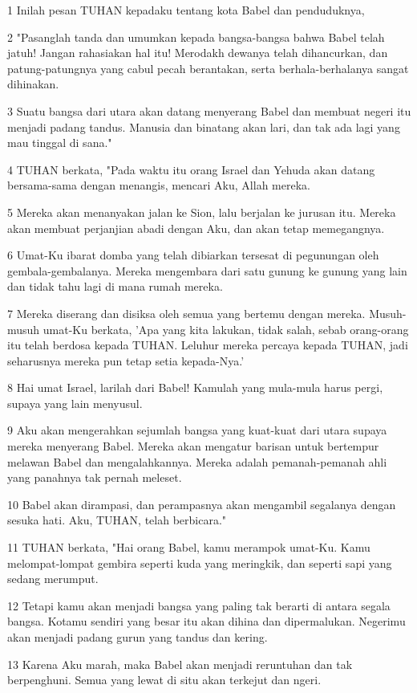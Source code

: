 \par 1 Inilah pesan TUHAN kepadaku tentang kota Babel dan penduduknya,
\par 2 "Pasanglah tanda dan umumkan kepada bangsa-bangsa bahwa Babel telah jatuh! Jangan rahasiakan hal itu! Merodakh dewanya telah dihancurkan, dan patung-patungnya yang cabul pecah berantakan, serta berhala-berhalanya sangat dihinakan.
\par 3 Suatu bangsa dari utara akan datang menyerang Babel dan membuat negeri itu menjadi padang tandus. Manusia dan binatang akan lari, dan tak ada lagi yang mau tinggal di sana."
\par 4 TUHAN berkata, "Pada waktu itu orang Israel dan Yehuda akan datang bersama-sama dengan menangis, mencari Aku, Allah mereka.
\par 5 Mereka akan menanyakan jalan ke Sion, lalu berjalan ke jurusan itu. Mereka akan membuat perjanjian abadi dengan Aku, dan akan tetap memegangnya.
\par 6 Umat-Ku ibarat domba yang telah dibiarkan tersesat di pegunungan oleh gembala-gembalanya. Mereka mengembara dari satu gunung ke gunung yang lain dan tidak tahu lagi di mana rumah mereka.
\par 7 Mereka diserang dan disiksa oleh semua yang bertemu dengan mereka. Musuh-musuh umat-Ku berkata, 'Apa yang kita lakukan, tidak salah, sebab orang-orang itu telah berdosa kepada TUHAN. Leluhur mereka percaya kepada TUHAN, jadi seharusnya mereka pun tetap setia kepada-Nya.'
\par 8 Hai umat Israel, larilah dari Babel! Kamulah yang mula-mula harus pergi, supaya yang lain menyusul.
\par 9 Aku akan mengerahkan sejumlah bangsa yang kuat-kuat dari utara supaya mereka menyerang Babel. Mereka akan mengatur barisan untuk bertempur melawan Babel dan mengalahkannya. Mereka adalah pemanah-pemanah ahli yang panahnya tak pernah meleset.
\par 10 Babel akan dirampasi, dan perampasnya akan mengambil segalanya dengan sesuka hati. Aku, TUHAN, telah berbicara."
\par 11 TUHAN berkata, "Hai orang Babel, kamu merampok umat-Ku. Kamu melompat-lompat gembira seperti kuda yang meringkik, dan seperti sapi yang sedang merumput.
\par 12 Tetapi kamu akan menjadi bangsa yang paling tak berarti di antara segala bangsa. Kotamu sendiri yang besar itu akan dihina dan dipermalukan. Negerimu akan menjadi padang gurun yang tandus dan kering.
\par 13 Karena Aku marah, maka Babel akan menjadi reruntuhan dan tak berpenghuni. Semua yang lewat di situ akan terkejut dan ngeri.
